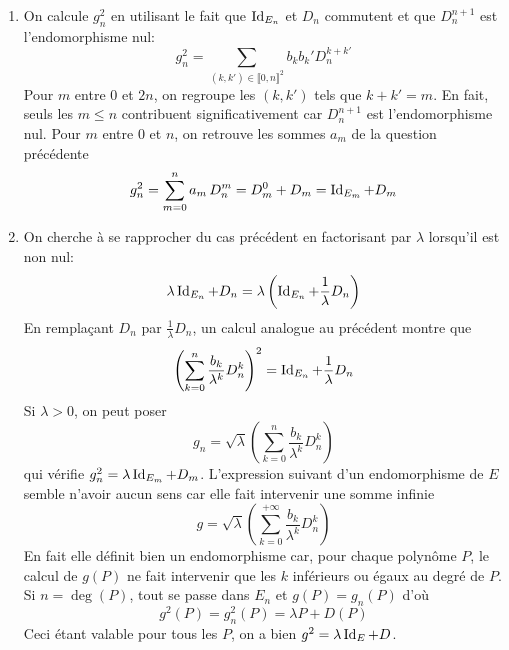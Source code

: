 \begin{enumerate}
  \item On calcule $g_n^2$ en utilisant le fait que $\operatorname{Id}_{E_n}$ et $D_n$ commutent et que $D_n^{n+1}$ est l'endomorphisme nul:
\begin{displaymath}
g_n^2 = \sum_{(k,k')\in \llbracket 0,n \rrbracket^2} b_kb_k'D_n^{k+k'}  
\end{displaymath}
Pour $m$ entre $0$ et $2n$, on regroupe les $(k,k')$ tels que $k+k'=m$. En fait, seuls les $m \leq n$ contribuent significativement car $D_n^{n+1}$ est l'endomorphisme nul.\newline
Pour $m$ entre 0 et $n$, on retrouve les sommes $a_m$ de la question précédente
\begin{displaymath}
  g_n^2 = \sum_{m=0}^{n} a_m\,D_n^{m} = D_m^0 + D_m = \operatorname{Id}_{E_m} + D_m
\end{displaymath}

  \item On cherche à se rapprocher du cas précédent en factorisant par $\lambda$ lorsqu'il est non nul:
\begin{displaymath}
\lambda \operatorname{Id}_{E_n} + D_n = \lambda \left( \operatorname{Id}_{E_n} + \frac{1}{\lambda}D_n\right)   
\end{displaymath}
En remplaçant $D_n$ par $\frac{1}{\lambda}D_n$, un calcul analogue au précédent montre que 
\begin{displaymath}
\left( \sum_{k=0}^{n}\frac{b_k}{\lambda^{k}}D_n^k\right)^2 = \operatorname{Id}_{E_n} + \frac{1}{\lambda}D_n   
\end{displaymath}
Si $\lambda>0$, on peut poser
\begin{displaymath}
  g_n = \sqrt{\lambda}\left( \sum_{k=0}^{n}\frac{b_k}{\lambda^{k}}D_n^k\right)
\end{displaymath}
qui vérifie $g_n^2 = \lambda \operatorname{Id}_{E_m} + D_m$.\newline
L'expression suivant d'un endomorphisme de $E$ semble n'avoir aucun sens car elle fait intervenir une somme infinie
\begin{displaymath}
  g = \sqrt{\lambda}\left( \sum_{k=0}^{+\infty}\frac{b_k}{\lambda^{k}}D_n^k\right)
\end{displaymath}
En fait elle définit bien un endomorphisme car, pour chaque polynôme $P$, le calcul de $g(P)$ ne fait intervenir que les $k$ inférieurs ou égaux au degré de $P$. Si $n=\deg(P)$, tout se passe dans $E_n$ et $g(P)=g_n(P)$ d'où 
\begin{displaymath}
  g^2(P) = g_n^2(P) = \lambda P + D(P)
\end{displaymath}
Ceci étant valable pour tous les $P$, on a bien $g^2 = \lambda \operatorname{Id}_E + D$.
\end{enumerate}

